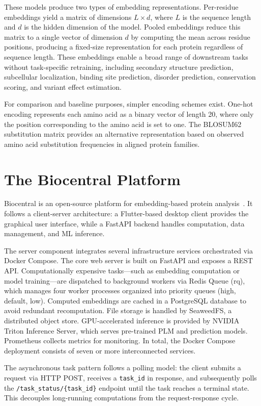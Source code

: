 These models produce two types of embedding representations. Per-residue embeddings yield a matrix of dimensions $L \times d$, where $L$ is the sequence length and $d$ is the hidden dimension of the model. Pooled embeddings reduce this matrix to a single vector of dimension $d$ by computing the mean across residue positions, producing a fixed-size representation for each protein regardless of sequence length. These embeddings enable a broad range of downstream tasks without task-specific retraining, including secondary structure prediction, subcellular localization, binding site prediction, disorder prediction, conservation scoring, and variant effect estimation.

For comparison and baseline purposes, simpler encoding schemes exist. One-hot encoding represents each amino acid as a binary vector of length 20, where only the position corresponding to the amino acid is set to one. The BLOSUM62 substitution matrix provides an alternative representation based on observed amino acid substitution frequencies in aligned protein families.

\section{The Biocentral Platform}\label{sec:biocentral}

Biocentral is an open-source platform for embedding-based protein analysis~\cite{Franz2025}. It follows a client-server architecture: a Flutter-based desktop client provides the graphical user interface, while a FastAPI backend handles computation, data management, and \ac{ML} inference.

The server component integrates several infrastructure services orchestrated via Docker Compose. The core web server is built on FastAPI and exposes a \ac{REST} \ac{API}. Computationally expensive tasks---such as embedding computation or model training---are dispatched to background workers via Redis Queue (rq), which manages four worker processes organized into priority queues (high, default, low). Computed embeddings are cached in a PostgreSQL database to avoid redundant recomputation. File storage is handled by SeaweedFS, a distributed object store. \ac{GPU}-accelerated inference is provided by NVIDIA Triton Inference Server, which serves pre-trained \ac{PLM} and prediction models. Prometheus collects metrics for monitoring. In total, the Docker Compose deployment consists of seven or more interconnected services.

The asynchronous task pattern follows a polling model: the client submits a request via HTTP POST, receives a \texttt{task\_id} in response, and subsequently polls the \texttt{/task\_status/\{task\_id\}} endpoint until the task reaches a terminal state. This decouples long-running computations from the request-response cycle.

